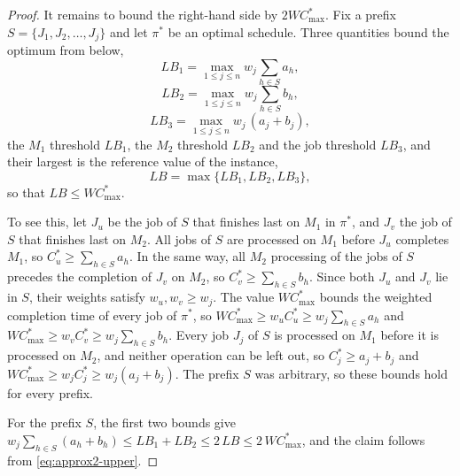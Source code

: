 \documentclass[12pt]{article}
\begin{document}
\begin{sloppypar}
\begin{proof}
            It remains to bound the right-hand side by $2W C_{\max}^{*}$. Fix a prefix
            $S=\{J_1,J_2,\dots,J_j\}$ and let $\pi^{*}$ be an optimal schedule. Three quantities bound the
            optimum from below,
            \begin{equation}\label{eq:lb1}
                LB_1=\max_{1\le j\le n}w_j\sum_{h\in S}a_h,
            \end{equation}
            \begin{equation}\label{eq:lb2}
                LB_2=\max_{1\le j\le n}w_j\sum_{h\in S}b_h,
            \end{equation}
            \begin{equation}\label{eq:lb3}
                LB_3=\max_{1\le j\le n}w_j\,(a_j+b_j),
            \end{equation}
            the $M_1$ threshold $LB_1$, the $M_2$ threshold $LB_2$ and the job threshold $LB_3$, and their
            largest is the reference value of the instance,
            \begin{equation}\label{eq:lb}
                LB=\max\{LB_1,LB_2,LB_3\},
            \end{equation}
            so that $LB\le W C_{\max}^{*}$.
            
            To see this, let $J_u$ be the job of $S$ that finishes last on $M_1$ in $\pi^{*}$, and $J_v$ the
            job of $S$ that finishes last on $M_2$. All jobs of $S$ are processed on $M_1$ before $J_u$
            completes $M_1$, so $C^{*}_u\ge\sum_{h\in S}a_h$. In the same way, all $M_2$ processing of the
            jobs of $S$ precedes the completion of $J_v$ on $M_2$, so $C^{*}_v\ge\sum_{h\in S}b_h$. Since
            both $J_u$ and $J_v$ lie in $S$, their weights satisfy $w_u,w_v\ge w_j$. The value
            $W C_{\max}^{*}$ bounds the weighted completion time of every job of $\pi^{*}$, so
            $W C_{\max}^{*}\ge w_u C^{*}_u\ge w_j\sum_{h\in S}a_h$ and
            $W C_{\max}^{*}\ge w_v C^{*}_v\ge w_j\sum_{h\in S}b_h$. Every job $J_j$ of $S$ is processed on
            $M_1$ before it is processed on $M_2$, and neither operation can be left out, so
            $C^{*}_j\ge a_j+b_j$ and $W C_{\max}^{*}\ge w_jC^{*}_j\ge w_j(a_j+b_j)$. The prefix $S$ was
            arbitrary, so these bounds hold for every prefix.
            
            For the prefix $S$, the first two bounds give
            $w_j\sum_{h\in S}(a_h+b_h)\le LB_1+LB_2\le 2\,LB\le 2\,W C_{\max}^{*}$, and the claim
            follows from \cref{eq:approx2-upper}.
        \end{proof}
        

\end{sloppypar}
\end{document}
